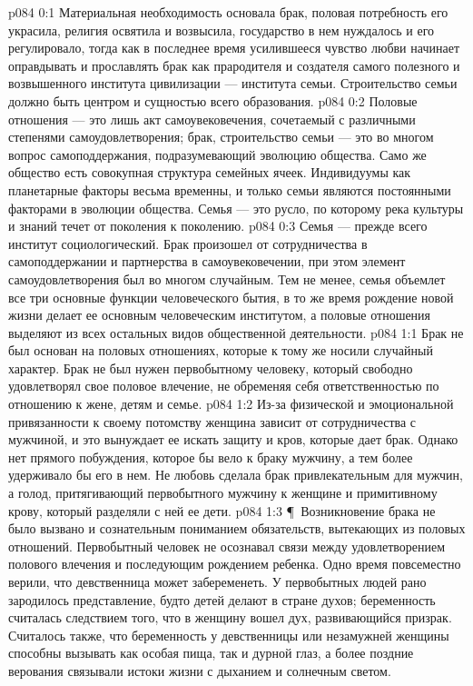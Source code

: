 \author{Глава Серафимов}
\vs p084 0:1 Материальная необходимость основала брак, половая потребность его украсила, религия освятила и возвысила, государство в нем нуждалось и его регулировало, тогда как в последнее время усилившееся чувство любви начинает оправдывать и прославлять брак как прародителя и создателя самого полезного и возвышенного института цивилизации --- института семьи. Строительство семьи должно быть центром и сущностью всего образования.
\vs p084 0:2 Половые отношения --- это лишь акт самоувековечения, сочетаемый с различными степенями самоудовлетворения; брак, строительство семьи --- это во многом вопрос самоподдержания, подразумевающий эволюцию общества. Само же общество есть совокупная структура семейных ячеек. Индивидуумы как планетарные факторы весьма временны, и только семьи являются постоянными факторами в эволюции общества. Семья --- это русло, по которому река культуры и знаний течет от поколения к поколению.
\vs p084 0:3 Семья --- прежде всего институт социологический. Брак произошел от сотрудничества в самоподдержании и партнерства в самоувековечении, при этом элемент самоудовлетворения был во многом случайным. Тем не менее, семья объемлет все три основные функции человеческого бытия, в то же время рождение новой жизни делает ее основным человеческим институтом, а половые отношения выделяют из всех остальных видов общественной деятельности.
\vs p084 1:1 Брак не был основан на половых отношениях, которые к тому же носили случайный характер. Брак не был нужен первобытному человеку, который свободно удовлетворял свое половое влечение, не обременяя себя ответственностью по отношению к жене, детям и семье.
\vs p084 1:2 Из\hyp{}за физической и эмоциональной привязанности к своему потомству женщина зависит от сотрудничества с мужчиной, и это вынуждает ее искать защиту и кров, которые дает брак. Однако нет прямого побуждения, которое бы вело к браку мужчину, а тем более удерживало бы его в нем. Не любовь сделала брак привлекательным для мужчин, а голод, притягивающий первобытного мужчину к женщине и примитивному крову, который разделяли с ней ее дети.
\vs p084 1:3 \P\ Возникновение брака не было вызвано и сознательным пониманием обязательств, вытекающих из половых отношений. Первобытный человек не осознавал связи между удовлетворением полового влечения и последующим рождением ребенка. Одно время повсеместно верили, что девственница может забеременеть. У первобытных людей рано зародилось представление, будто детей делают в стране духов; беременность считалась следствием того, что в женщину вошел дух, развивающийся призрак. Считалось также, что беременность у девственницы или незамужней женщины способны вызывать как особая пища, так и дурной глаз, а более поздние верования связывали истоки жизни с дыханием и солнечным светом.
